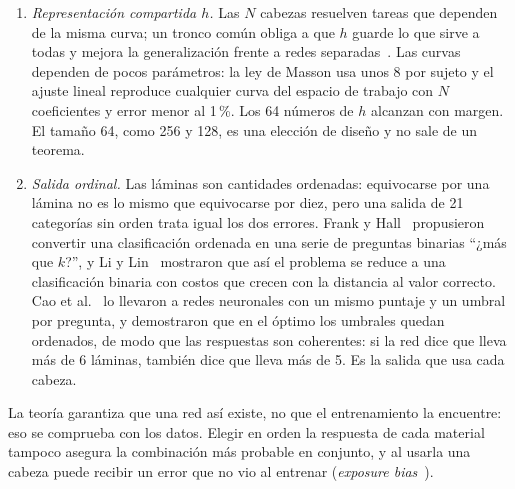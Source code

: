 \begin{enumerate}[label=(\alph*)]
\item \emph{Representación compartida $h$.} Las $N$ cabezas resuelven tareas que dependen de la misma curva; un tronco común obliga a que $h$ guarde lo que sirve a todas y mejora la generalización frente a redes separadas~\cite{caruana,bengio13}. Las curvas dependen de pocos parámetros: la ley de Masson usa unos 8 por sujeto y el ajuste lineal reproduce cualquier curva del espacio de trabajo con $N$ coeficientes y error menor al 1\,\%. Los 64 números de $h$ alcanzan con margen. El tamaño 64, como 256 y 128, es una elección de diseño y no sale de un teorema.
\item \emph{Salida ordinal.} Las láminas son cantidades ordenadas: equivocarse por una lámina no es lo mismo que equivocarse por diez, pero una salida de 21 categorías sin orden trata igual los dos errores. Frank y Hall~\cite{frankhall} propusieron convertir una clasificación ordenada en una serie de preguntas binarias ``¿más que $k$?'', y Li y Lin~\cite{lilin} mostraron que así el problema se reduce a una clasificación binaria con costos que crecen con la distancia al valor correcto. Cao et al.~\cite{cao} lo llevaron a redes neuronales con un mismo puntaje y un umbral por pregunta, y demostraron que en el óptimo los umbrales quedan ordenados, de modo que las respuestas son coherentes: si la red dice que lleva más de 6 láminas, también dice que lleva más de 5. Es la salida que usa cada cabeza.
\end{enumerate}
La teoría garantiza que una red así existe, no que el entrenamiento la encuentre: eso se comprueba con los datos. Elegir en orden la respuesta de cada material tampoco asegura la combinación más probable en conjunto, y al usarla una cabeza puede recibir un error que no vio al entrenar (\emph{exposure bias}~\cite{bengio15}).


